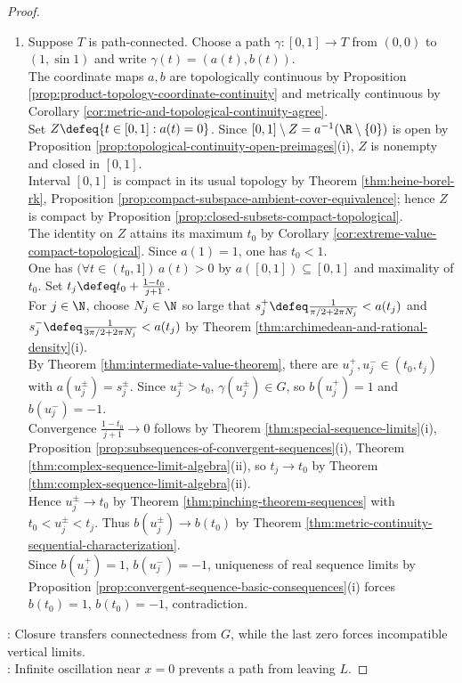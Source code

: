 \begin{counterexample}
\begin{proof}
\begin{enumerate}[label=(\roman*)]
\item Suppose $T$ is path-connected. Choose a path $\gamma:[0,1]\to T$ from $(0,0)$ to $(1,\sin1)$ and write $\gamma(t)=(a(t),b(t))$.\\
The coordinate maps $a,b$ are topologically continuous by Proposition \ref{prop:product-topology-coordinate-continuity} and metrically continuous by Corollary \ref{cor:metric-and-topological-continuity-agree}.\\
Set $Z\defeq\{t\in[0,1]:a(t)=0\}$. Since $[0,1]\setminus Z=a^{-1}(\R\setminus\{0\})$ is open by Proposition \ref{prop:topological-continuity-open-preimages}(i), $Z$ is nonempty and closed in $[0,1]$.\\
Interval $[0,1]$ is compact in its usual topology by Theorem \ref{thm:heine-borel-rk},  Proposition \ref{prop:compact-subspace-ambient-cover-equivalence}; hence $Z$ is compact by Proposition \ref{prop:closed-subsets-compact-topological}.\\
The identity on $Z$ attains its maximum $t_0$ by Corollary \ref{cor:extreme-value-compact-topological}. Since $a(1)=1$, one has $t_0<1$.\\
One has $(\forall t\in(t_0,1])\,a(t)>0$ by $a([0,1])\subseteq[0,1]$ and maximality of $t_0$. Set $t_j\defeq t_0+\frac{1-t_0}{j+1}$.\\
For $j\in\N$, choose $N_j\in\N$ so large that $s_j^+\defeq\frac{1}{\pi/2+2\pi N_j}<a(t_j)$ and $s_j^-\defeq\frac{1}{3\pi/2+2\pi N_j}<a(t_j)$ by Theorem \ref{thm:archimedean-and-rational-density}(i).\\
By Theorem \ref{thm:intermediate-value-theorem}, there are $u_j^+,u_j^-\in(t_0,t_j)$ with $a(u_j^\pm)=s_j^\pm$. Since $u_j^\pm>t_0$, $\gamma(u_j^\pm)\in G$, so $b(u_j^+)=1$ and $b(u_j^-)=-1$.\\
Convergence $\frac{1-t_0}{j+1}\to0$ follows by Theorem \ref{thm:special-sequence-limits}(i), Proposition \ref{prop:subsequences-of-convergent-sequences}(i), Theorem \ref{thm:complex-sequence-limit-algebra}(ii), so $t_j\to t_0$ by Theorem \ref{thm:complex-sequence-limit-algebra}(ii).\\
Hence $u_j^\pm\to t_0$ by Theorem \ref{thm:pinching-theorem-sequences} with $t_0<u_j^\pm<t_j$. Thus $b(u_j^\pm)\to b(t_0)$ by Theorem \ref{thm:metric-continuity-sequential-characterization}.\\
Since $b(u_j^+)=1$, $b(u_j^-)=-1$, uniqueness of real sequence limits by Proposition \ref{prop:convergent-sequence-basic-consequences}(i) forces $b(t_0)=1$, $b(t_0)=-1$, contradiction.
\end{enumerate}
: Closure transfers connectedness from $G$, while the last zero forces incompatible vertical limits.\\
: Infinite oscillation near $x=0$ prevents a path from leaving $L$.
\end{proof}
\end{counterexample}

